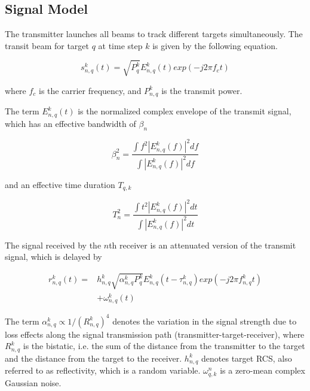 \documentclass[12pt,journal,draftclsnofoot,onecolumn]{IEEEtran}
\begin{document}
\subsection{Signal Model}
The transmitter launches all beams to track different targets simultaneously. The transit beam for target $q$ at time step $k$ is given by the following equation.

\begin{equation}
    s_{n,q}^k(t)=\sqrt{P_{q}^k}E_{n,q}^k(t)exp(-j2\pi f_{c}t)
\end{equation}

where $f_{c}$ is the carrier frequency, and $P_{n,q}^k$ is the transmit power.

The term $E_{n,q}^k(t)$ is the normalized complex envelope of the transmit signal, which has an effective bandwidth of $\beta_{n}$

\begin{equation}
    \beta_{n}^2=\frac{\int f^2|E_{n,q}^k(f)|^2df}{\int |E_{n,q}^k(f)|^2df}
    \label{bandwidth}
\end{equation}

and an effective time duration $T_{q,k}$

\begin{equation}
    T_{n}^2=\frac{\int t^2|E_{n,q}^k(f)|^2dt}{\int |E_{n,q}^k(f)|^2dt}
    \label{time duration}
\end{equation}

The signal received by the $n$th receiver is an attenuated version of the transmit signal, which is delayed by

\begin{equation}
\begin{aligned}
    r_{n,q}^k(t)=&h_{n,q}^k\sqrt{\alpha_{n,q}^{k}P_{q}^k}E_{n,q}^k(t-\tau_{n,q}^k)exp(-j2\pi f_{n,q}^kt)\\
    &+\omega_{n,q}^{k}(t)
\end{aligned}
\end{equation}

The term $\alpha_{n,q}^k \propto{1/(R_{n,q}^k)^4}$ denotes the variation in the signal strength due to loss effects along the signal transmission path (transmitter-target-receiver), %
 where $R_{n,q}^k$ is the bistatic, i.e. the sum of the distance from the transmitter to the target and the distance from the target to the receiver. $h_{n,q}^k$ denotes target RCS, also referred to as reflectivity, which is a random variable. $\omega_{q,k}^n$ is a zero-mean complex Gaussian noise.
\end{document}
